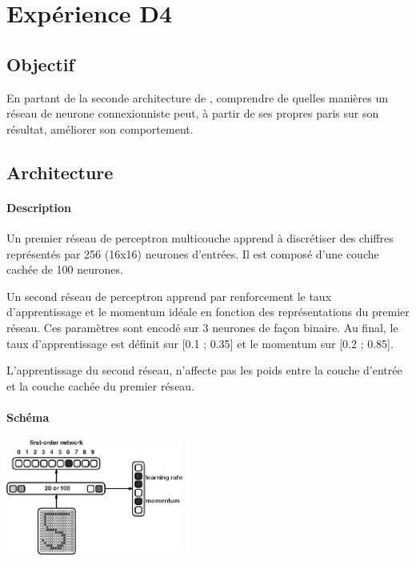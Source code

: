 \section{Expérience D4} 
  \subsection{Objectif}
    En partant de la seconde architecture de \cite{Cleeremans_2007}, 
    comprendre de quelles manières un réseau de neurone connexionniste peut, à partir de ses propres paris
    sur son résultat, améliorer son comportement.
  
  
  \subsection{Architecture}
    \paragraph{Description}
      Un premier réseau de perceptron multicouche apprend à discrétiser des chiffres représentés
      par 256 (16x16) neurones d'entrées. Il est composé d'une couche cachée de 100 neurones.
      
      Un second réseau de perceptron apprend par renforcement le taux d'apprentissage et le
      momentum idéale en fonction des représentations du premier réseau. Ces paramètres sont 
      encodé sur 3 neurones de façon binaire. Au final, le taux d'apprentissage est définit 
      sur [0.1 ; 0.35] et le momentum sur [0.2 ; 0.85].
      
      L'apprentissage du second réseau, n'affecte pas les poids entre la couche d'entrée et la 
      couche cachée du premier réseau.
    \paragraph{Schéma}
      \begin{center}
	\includegraphics[width=220px]{data/expD4/schema.png}
      \end{center}
      
